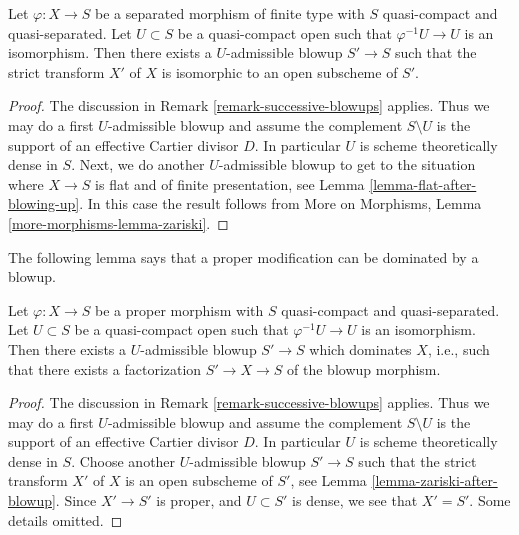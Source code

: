 \begin{lemma}
\label{lemma-zariski-after-blowup}
Let $\varphi : X \to S$ be a separated morphism of finite type with
$S$ quasi-compact and quasi-separated. Let $U \subset S$ be a
quasi-compact open such that $\varphi^{-1}U \to U$ is an isomorphism.
Then there exists a $U$-admissible blowup $S' \to S$ such that
the strict transform $X'$ of $X$ is isomorphic to an open subscheme
of $S'$.
\end{lemma}

\begin{proof}
The discussion in Remark \ref{remark-successive-blowups} applies.
Thus we may do a first $U$-admissible blowup and assume the complement
$S \setminus U$ is the support of an effective Cartier divisor $D$.
In particular $U$ is scheme theoretically dense in $S$.
Next, we do another $U$-admissible blowup to get to the situation where
$X \to S$ is flat and of finite presentation, see
Lemma \ref{lemma-flat-after-blowing-up}.
In this case the result follows from
More on Morphisms, Lemma \ref{more-morphisms-lemma-zariski}.
\end{proof}

\noindent
The following lemma says that a proper modification can be dominated
by a blowup.

\begin{lemma}
\label{lemma-dominate-modification-by-blowup}
Let $\varphi : X \to S$ be a proper morphism with
$S$ quasi-compact and quasi-separated. Let $U \subset S$ be a
quasi-compact open such that $\varphi^{-1}U \to U$ is an isomorphism.
Then there exists a $U$-admissible blowup $S' \to S$
which dominates $X$, i.e., such that there exists a factorization
$S' \to X \to S$ of the blowup morphism.
\end{lemma}

\begin{proof}
The discussion in Remark \ref{remark-successive-blowups} applies.
Thus we may do a first $U$-admissible blowup and assume the complement
$S \setminus U$ is the support of an effective Cartier divisor $D$.
In particular $U$ is scheme theoretically dense in $S$.
Choose another $U$-admissible blowup $S' \to S$ such that the strict
transform $X'$ of $X$ is an open subscheme of $S'$, see
Lemma \ref{lemma-zariski-after-blowup}.
Since $X' \to S'$ is proper, and
$U \subset S'$ is dense, we see that $X' = S'$. Some details omitted.
\end{proof}






















